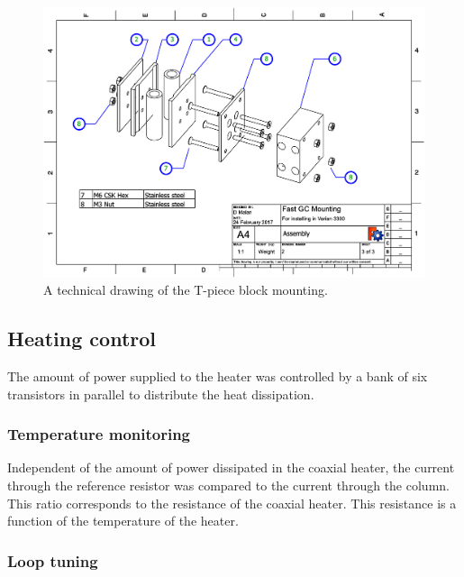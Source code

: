 \begin{figure}
	\centering
	\includegraphics[angle=90, origin=c, width=\textwidth]{Figures/CarDrawing3.pdf}
	\decoRule	
	\caption[Technical drawing of coaxial heater mounting.]{A technical drawing of the T-piece block mounting.} 
	\label{fig:CarsDrawing3}
\end{figure}


\subsection{Heating control}

The amount of power supplied to the heater was controlled by a bank of six
transistors in parallel to distribute the heat dissipation.

\subsubsection{Temperature monitoring}

Independent of the amount of power dissipated in the coaxial heater, the current
through the reference resistor was compared to the current through the column.
This ratio corresponds to the resistance of the coaxial heater. This resistance
is a function of the temperature of the heater.

\subsubsection{Loop tuning}


